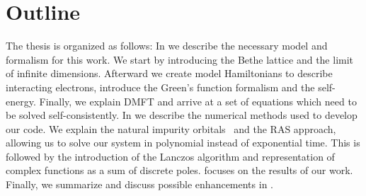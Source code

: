 \section{Outline}

The thesis is organized as follows:
In  we describe the necessary model and formalism for this work.
We start by introducing the Bethe lattice and the limit of infinite dimensions.
Afterward we create model Hamiltonians to describe interacting electrons,
introduce the Green's function formalism and the self-energy.
Finally, we explain DMFT and
arrive at a set of equations which need to be solved self-consistently.
In  we describe the numerical methods used to develop our code.
We explain the natural impurity orbitals~\cite{Lu2014, Lu2019} and the RAS approach,
allowing us to solve our system in polynomial instead of exponential time.
This is followed by the introduction of the Lanczos algorithm and representation of complex
functions as a sum of discrete poles.
 focuses on the results of our work.
Finally, we summarize and discuss possible enhancements in .
